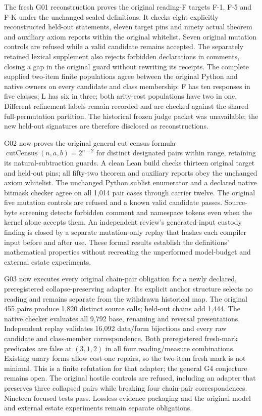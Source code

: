 \documentclass[
  11pt,
]{article}
\begin{document}
The fresh G01 reconstruction proves the original reading-F targets F-1,
F-5 and F-K under the unchanged sealed definitions. It checks eight
explicitly reconstructed held-out statements, eleven target pins and
ninety actual theorem and auxiliary axiom reports within the original
whitelist. Seven original mutation controls are refused while a valid
candidate remains accepted. The separately retained lexical supplement
also rejects forbidden declarations in comments, closing a gap in the
original guard without rewriting its receipts. The complete supplied
two-item finite populations agree between the original Python and native
owners on every candidate and class membership: F has ten responses in
five classes; L has six in three; both arity-cost populations have two
in one. Different refinement labels remain recorded and are checked
against the shared full-permutation partition. The historical frozen
judge packet was unavailable; the new held-out signatures are therefore
disclosed as reconstructions.

G02 now proves the original general cut-census formula
\(\operatorname{cutCensus}(n,a,b)=2^{n-2}\) for distinct designated
pairs within range, retaining its natural-subtraction guards. A clean
Lean build checks thirteen original target and held-out pins; all
fifty-two theorem and auxiliary reports obey the unchanged axiom
whitelist. The unchanged Python sublist enumerator and a declared native
bitmask checker agree on all 1,014 pair cases through carrier twelve.
The original five mutation controls are refused and a known valid
candidate passes. Source-byte screening detects forbidden comment and
namespace tokens even when the kernel alone accepts them. An independent
review's generated-input custody finding is closed by a separate
mutation-only replay that hashes each compiler input before and after
use. These formal results establish the definitions' mathematical
properties without recreating the unperformed model-budget and external
estate experiments.

G03 now executes every original chain-pair obligation for a newly
declared, preregistered collapse-preserving adapter. Its explicit anchor
structure selects no reading and remains separate from the withdrawn
historical map. The original 455 pairs produce 1,820 distinct source
calls; held-out chains add 1,444. The native checker evaluates all 9,792
base, renaming and reversal presentations. Independent replay validates
16,092 data/form bijections and every raw candidate and class-member
correspondence. Both preregistered fresh-mark predicates are false at
\((3,1,2)\) in all four reading/measure combinations. Existing unary
forms allow cost-one repairs, so the two-item fresh mark is not minimal.
This is a finite refutation for that adapter; the general G4 conjecture
remains open. The original hostile controls are refused, including an
adapter that preserves three collapsed pairs while breaking four
chain-pair correspondences. Nineteen focused tests pass. Lossless
evidence packaging and the original model and external estate
experiments remain separate obligations.
\end{document}
